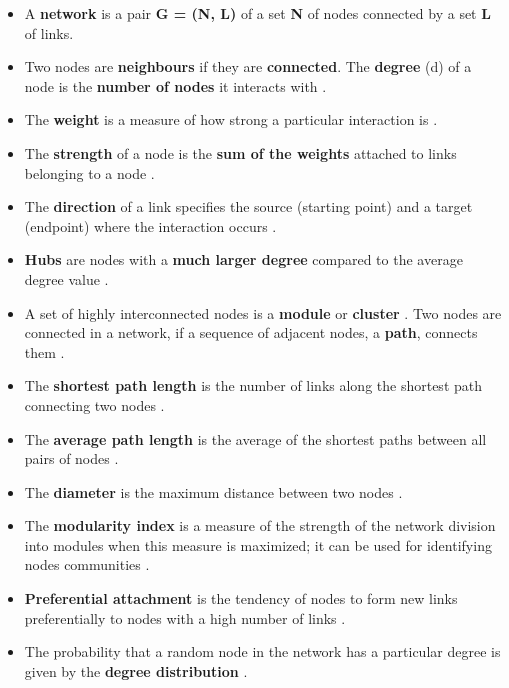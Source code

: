 \documentclass[
]{book}
\begin{document}
\begin{itemize}
\item
  A \textbf{network} is a pair \textbf{G = (N, L)} of a set \textbf{N} of nodes connected by a set \textbf{L} of links.
\item
  Two nodes are \textbf{neighbours} if they are \textbf{connected}. The \textbf{degree} (d) of a node is the \textbf{number of nodes} it interacts with \citep{Bondy2008GraphTheory}.
\item
  The \textbf{weight} is a measure of how strong a particular interaction is \citep{Bondy2008GraphTheory}.
\item
  The \textbf{strength} of a node is the \textbf{sum of the weights} attached to links belonging to a node \citep{Barrat2003TheNetworks}.
\item
  The \textbf{direction} of a link specifies the source (starting point) and a target (endpoint) where the interaction occurs \citep{Barabasi2016} .
\item
  \textbf{Hubs} are nodes with a \textbf{much larger degree} compared to the average degree value \citep{Barrat2003TheNetworks}.
\item
  A set of highly interconnected nodes is a \textbf{module} or \textbf{cluster} \citep{Li2009}. Two nodes are connected in a network, if a sequence of adjacent nodes, a \textbf{path}, connects them \citep{barabasi2004network}.
\item
  The \textbf{shortest path length} is the number of links along the shortest path connecting two nodes \citep{barabasi2004network}.
\item
  The \textbf{average path length} is the average of the shortest paths between all pairs of nodes \citep{barabasi2004network}.
\item
  The \textbf{diameter} is the maximum distance between two nodes \citep{Bondy2008GraphTheory}.
\item
  The \textbf{modularity index} is a measure of the strength of the network division into modules when this measure is maximized; it can be used for identifying nodes communities \citep{Newman2018}.
\item
  \textbf{Preferential attachment} is the tendency of nodes to form new links preferentially to nodes with a high number of links \citep{barabasi1999emergence, Vazquez2003GrowingCorrelations}.
\item
  The probability that a random node in the network has a particular degree is given by the \textbf{degree distribution} \citep{barabasi2004network}.

\end{itemize}
\end{document}
